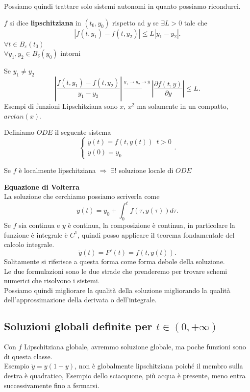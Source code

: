 \documentclass[12px]{article}
\begin{document}
Possiamo quindi trattare solo sistemi autonomi in quanto possiamo ricondurci.
\newpage
\begin{defi}[Lipschitziana]
	$f$ si dice \textbf{lipschitziana} in $(t_0,y_0)$ rispetto ad $y$ se $\exists L > 0 $ tale che
	\[
	|f(t,y_1)-f(t,y_2)|\leq L |y_1-y_2|
	.\] 
	$\forall t\in B_\varepsilon(t_0)$\\
 $\forall y_1,y_2\in B_\delta(y_0)$ intorni
\end{defi}
Se $y_1\neq y_2$ 
\[
	\left|\frac{f(t,y_1) - f(t,y_2)}{y_1-y_2}\right| \xrightarrow
{y_1 \rightarrow y_2 \rightarrow \bar y} \left|\frac{\partial f(t,y)}{\partial y}\right|\leq L.\] 
Esempi di funzioni Lipschitziana sono $x$, $x^2$ ma solamente in un compatto, $arctan(x)$. 
\begin{defi}[ODE]
	Definiamo $ODE$ il seguente sistema
	\[
	\begin{cases}
		\dot y(t) = f(t,y(t)) \ \ t > 0\\
		y(0) = y_0
	\end{cases}
	.\] 
\end{defi}
\begin{teo}
	Se $f$ è localmente lipschitziana $ \Rightarrow $ $\exists !$ soluzione locale di  $ODE$
\end{teo}
\textbf{Equazione di Volterra}\\
La soluzione che cerchiamo possiamo scriverla come 
\[
y(t) = y_0 + \int^t_0f(\tau,y(\tau))d\tau
.\] 
Se $f$ sia continua e $y$ è continua, la composizione è continua, in particolare la funzione è integrale è  $C^1$, quindi posso applicare il teorema fondamentale del calcolo integrale.
 \[
\dot y(t) = F'(t) = f(t,y(t))
.\] 
Solitamente si riferisce a questa forma come forma debole della soluzione.\\

Le due formulazioni sono le due strade che prenderemo per trovare schemi numerici che risolvono i sistemi.\\

Possiamo quindi migliorare la qualità della soluzione migliorando la qualità dell'approssimazione della derivata o dell'integrale.

\subsection{Soluzioni globali definite per $t\in (0,+\infty)$}
Con $f$ Lipschitziana globale, avremmo soluzione globale, ma poche funzioni sono di questa classe.\\

Esempio $\dot y = y(1-y)$, non è globalmente lipschitziana poiché il membro sulla destra è quadratico, Esempio dello sciacquone, più acqua è presente, meno entra successivamente fino a fermarsi. \\
\end{document}
